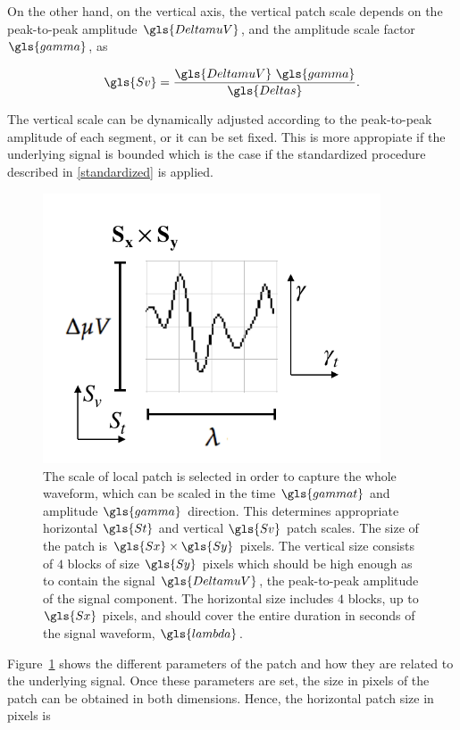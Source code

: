 On the other hand, on the vertical axis, the vertical patch scale depends on the peak-to-peak amplitude $\gls{DeltamuV}$, and the amplitude scale factor $\gls{gamma}$, as

\begin{equation}
\gls{Sv} = \frac{\gls{DeltamuV} \ \gls{gamma}}{\gls{Deltas}}.
\label{eq:verticalpatchscale}
\end{equation}

The vertical scale can be dynamically adjusted according to the peak-to-peak amplitude of each segment, or it can be set fixed.  This is more appropiate if the underlying signal is bounded which is the case if the standardized procedure described in \ref{standardized} is applied.

\begin{figure}[h!]
\centering
\includegraphics[width=10cm]{images/patchgeometry.pdf}
\caption[Patch Geometry]{The scale of local patch is selected in order to capture the whole waveform, which can be scaled in the time $\gls{gammat}$ and amplitude $\gls{gamma}$ direction.  This determines appropriate horizontal $\gls{St}$ and vertical $\gls{Sv}$ patch scales.  The size of the patch is $\gls{Sx} \times \gls{Sy}$ pixels. The vertical size consists of $4$ blocks of size $\gls{Sy}$ pixels which should be high enough as to contain the signal $\gls{DeltamuV}$, the peak-to-peak amplitude of the signal component. The horizontal size includes $4$ blocks, up to $\gls{Sx}$ pixels, and should cover the entire duration in seconds of the signal waveform, $\gls{lambda}$.   }
\label{fig:patchgeometry}
\end{figure}

Figure~\ref{fig:patchgeometry} shows the different parameters of the patch and how they are related to the underlying signal. Once these parameters are set, the size in pixels of the patch can be obtained in both dimensions.  Hence, the horizontal patch size in pixels is

